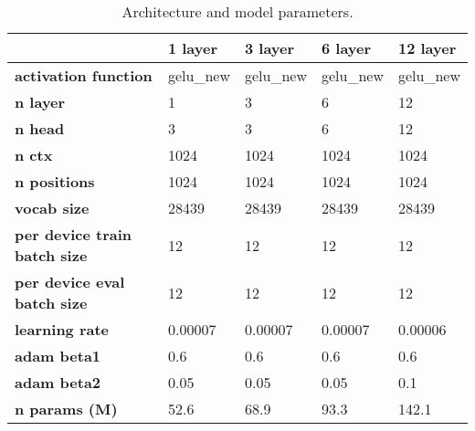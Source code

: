 \begin{table}
\centering
\caption{Architecture and model parameters.}
\label{tab:model-train-info}
\begin{tabular}{lllll}
\toprule
{} &   1 layer &   3 layer &   6 layer &  12 layer \\
\midrule
\textbf{activation function        } &  gelu\_new &  gelu\_new &  gelu\_new &  gelu\_new \\
\textbf{n layer                    } &         1 &         3 &         6 &        12 \\
\textbf{n head                     } &         3 &         3 &         6 &        12 \\
\textbf{n ctx                      } &      1024 &      1024 &      1024 &      1024 \\
\textbf{n positions                } &      1024 &      1024 &      1024 &      1024 \\
\textbf{vocab size                 } &     28439 &     28439 &     28439 &     28439 \\
\textbf{per device train batch size} &        12 &        12 &        12 &        12 \\
\textbf{per device eval batch size } &        12 &        12 &        12 &        12 \\
\textbf{learning rate              } &   0.00007 &   0.00007 &   0.00007 &   0.00006 \\
\textbf{adam beta1                 } &       0.6 &       0.6 &       0.6 &       0.6 \\
\textbf{adam beta2                 } &      0.05 &      0.05 &      0.05 &       0.1 \\
\textbf{n params (M)               } &      52.6 &      68.9 &      93.3 &     142.1 \\
\bottomrule
\end{tabular}
\end{table}
